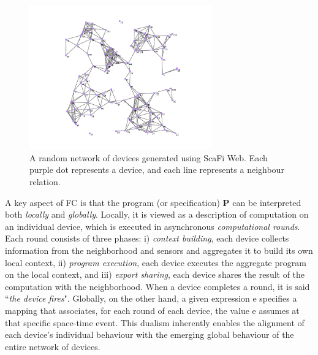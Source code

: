 \documentclass[12pt,a4paper,openright,twoside]{book}
\begin{document}
\begin{figure}[t]
    \centering
    \includegraphics[width=0.7\textwidth]{figures/scafi-web-example.png}
    \caption{A random network of devices generated using ScaFi Web. 
        Each purple dot represents a device, and each line represents a neighbour relation.}
    \label{fig:random-network}
\end{figure}

A key aspect of FC is that the program (or specification) \textbf{P} can be interpreted both 
    \emph{locally} and \emph{globally}. Locally, it is viewed as a description of computation on 
    an individual device, which is executed in asynchronous \emph{computational rounds}. 
    Each round consists of three phases:
    i) \emph{context building}, each device collects information from the 
         neighborhood and sensors and aggregates it to build its own local context,
    ii) \emph{program execution}, each device executes the aggregate program on the local context, and
    iii) \emph{export sharing}, each device shares the result of the computation with the neighborhood.
    When a device completes a round, it is said ``\emph{the device fires}".
    Globally, on the other hand, a given expression \textsf{e} specifies a mapping that associates, 
    for each round of each device, the value \textsf{e} assumes at that specific space-time event.
    This dualism inherently enables the alignment of each device's individual behaviour with the 
    emerging global behaviour of the entire network of devices.
\end{document}
